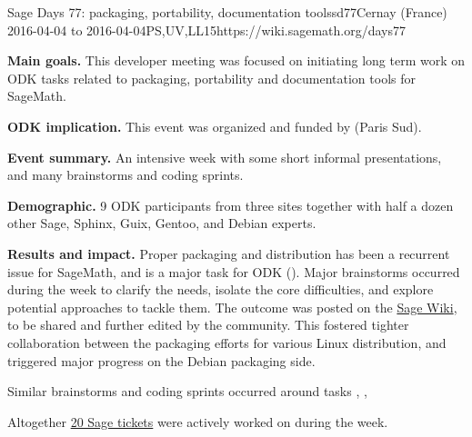\begin{event}{Sage Days 77: packaging, portability, documentation tools}{sd77}{Cernay (France) 2016-04-04 to 2016-04-04}{PS,UV,LL}{15}{https://wiki.sagemath.org/days77}

  \textbf{Main goals.} This developer meeting was focused on
  initiating long term work on ODK tasks related to packaging,
  portability and documentation tools for SageMath.

  \textbf{ODK implication.} This event was organized and funded by
  \ODK (Paris Sud).

  \textbf{Event summary.} An intensive week with some short informal
  presentations, and many brainstorms and coding sprints.

  \textbf{Demographic.} 9 ODK participants from three sites together
  with half a dozen other Sage, Sphinx, Guix, Gentoo, and Debian
  experts.

  \textbf{Results and impact.} Proper packaging and distribution has
  been a recurrent issue for SageMath, and is a major task for ODK
  (). Major brainstorms occurred during
  the week to clarify the needs, isolate the core difficulties, and
  explore potential approaches to tackle them. The outcome was posted
  on the \href{https://wiki.sagemath.org/days77/packaging}{Sage Wiki},
  to be shared and further edited by the community. This fostered
  tighter collaboration between the packaging efforts for various
  Linux distribution, and triggered major progress on the Debian
  packaging side.

  Similar brainstorms and coding sprints occurred around tasks
  ,
  , 

  Altogether
  \href{https://trac.sagemath.org/query?keywords=~days77&col=id&col=summary&col=status&col=type&col=priority&col=milestone&col=component&order=priority}{20
    Sage tickets} were actively worked on during the week.
\end{event}
